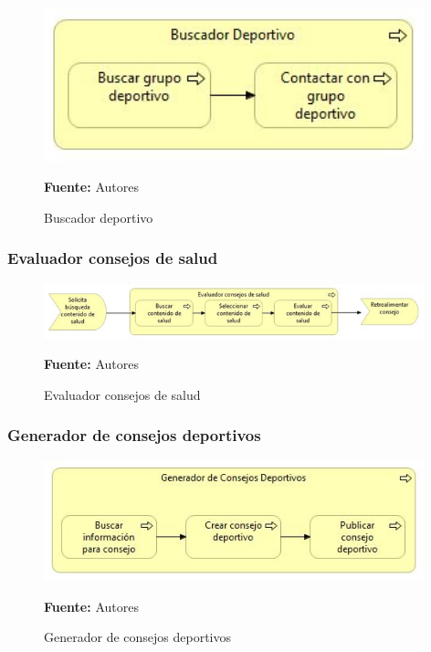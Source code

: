 \begin{figure}[!htb]
  \begin{center}
    \includegraphics[width=11cm]{./imagenes/Archimate/vistas/business_process/buscadordeportivo.png}
    \caption{Buscador deportivo}
    \label{fig:BP_BuscadorDeportivo}
    \textbf{Fuente:}  Autores
  \end{center}
\end{figure}

\subsubsection{Evaluador consejos de salud}

\begin{figure}[!htb]
  \begin{center}
    \includegraphics[width=11cm]{./imagenes/Archimate/vistas/business_process/evaluadorconsejossalud.png}
    \caption{Evaluador consejos de salud}
    \label{fig:BP_EvaluadorConsejosSalud}
    \textbf{Fuente:}  Autores
  \end{center}
\end{figure}

\subsubsection{Generador de consejos deportivos}

\begin{figure}[!htb]
  \begin{center}
    \includegraphics[width=11cm]{./imagenes/Archimate/vistas/business_process/generadorconsejosdeportivos.png}
    \caption{Generador de consejos deportivos}
    \label{fig:BP_GeneradorConsejosDeportivos}
    \textbf{Fuente:}  Autores
  \end{center}
\end{figure}

